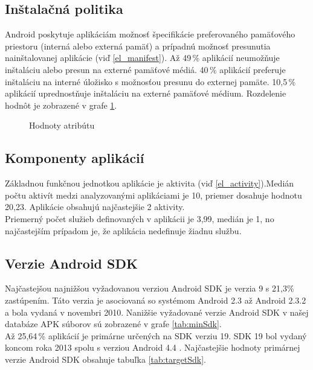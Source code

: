 \subsection*{Inštalačná politika}
Android poskytuje aplikáciám možnosť špecifikácie preferovaného pamäťového priestoru (interná alebo externá pamäť) a prípadnú možnosť presunutia nainštalovanej aplikácie (viď \ref{el_manifest}). Až 49\,\% aplikácií neumožňuje inštaláciu alebo presun na externé pamäťové médiá.  40\,\% aplikácií preferuje inštaláciu na interné úložisko s možnosťou presunu do externej pamäte. 10,5\,\% aplikácií uprednostňuje inštaláciu na externé pamäťové médium. Rozdelenie hodnôt je zobrazené v grafe \ref{fig:installLoc}.

\begin{figure}[!htbp]
\centering
{}
\label{fig:installLoc}
\caption{Hodnoty atribútu }
\end{figure}

\subsection*{Komponenty aplikácií}

Základnou funkčnou jednotkou aplikácie je aktivita (viď \ref{el_activity}).Medián počtu aktivít medzi analyzovanými aplikáciami je  10, priemer dosahuje hodnotu 20,23. Aplikácie obsahujú najčastejšie 2 aktivity.\\Priemerný počet služieb definovaných v aplikácii je 3,99, medián je 1, no najčastejším prípadom je, že aplikácia nedefinuje žiadnu službu.

\subsection*{Verzie Android SDK}

Najčastejšou najnižšou vyžadovanou verziou Android SDK je verzia 9 s 21,3\% zastúpením. Táto verzia je asociovaná so systémom Android 2.3 až Android 2.3.2  a bola vydaná v novembri 2010. Nanižšie vyžadované verzie Android SDK v našej databáze APK súborov sú zobrazené v grafe \ref{tab:minSdk}.
\\Až 25,64\,\% aplikácií je primárne určených na SDK verziu 19. SDK 19 bol vydaný koncom roka 2013 spolu s verziou Android 4.4 . Najčastejšie hodnoty primárnej verzie Android SDK obsahuje tabuľka \ref{tab:targetSdk}.

